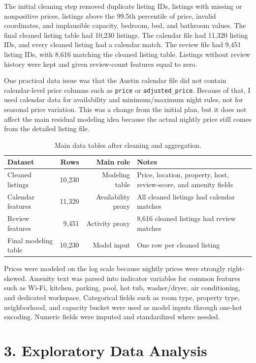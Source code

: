 \documentclass[11pt]{article}
\begin{document}
The initial cleaning step removed duplicate listing IDs, listings with missing or nonpositive prices, listings above the 99.5th percentile of price, invalid coordinates, and implausible capacity, bedroom, bed, and bathroom values. The final cleaned listing table had 10,230 listings. The calendar file had 11,320 listing IDs, and every cleaned listing had a calendar match. The review file had 9,451 listing IDs, with 8,616 matching the cleaned listing table. Listings without review history were kept and given review-count features equal to zero.

One practical data issue was that the Austin calendar file did not contain calendar-level price columns such as \texttt{price} or \texttt{adjusted\_price}. Because of that, I used calendar data for availability and minimum/maximum night rules, not for seasonal price variation. This was a change from the initial plan, but it does not affect the main residual modeling idea because the actual nightly price still comes from the detailed listing file.

\begin{table}[H]
\centering
\caption{Main data tables after cleaning and aggregation.}
\begin{tabular}{lrrl}
\toprule
Dataset & Rows & Main role & Notes \\
\midrule
Cleaned listings & 10,230 & Modeling table & Price, location, property, host, review-score, and amenity fields \\
Calendar features & 11,320 & Availability proxy & All cleaned listings had calendar matches \\
Review features & 9,451 & Activity proxy & 8,616 cleaned listings had review matches \\
Final modeling table & 10,230 & Model input & One row per cleaned listing \\
\bottomrule
\end{tabular}
\end{table}

Prices were modeled on the log scale because nightly prices were strongly right-skewed. Amenity text was parsed into indicator variables for common features such as Wi-Fi, kitchen, parking, pool, hot tub, washer/dryer, air conditioning, and dedicated workspace. Categorical fields such as room type, property type, neighborhood, and capacity bucket were used as model inputs through one-hot encoding. Numeric fields were imputed and standardized where needed.

\section*{3. Exploratory Data Analysis}
\end{document}
